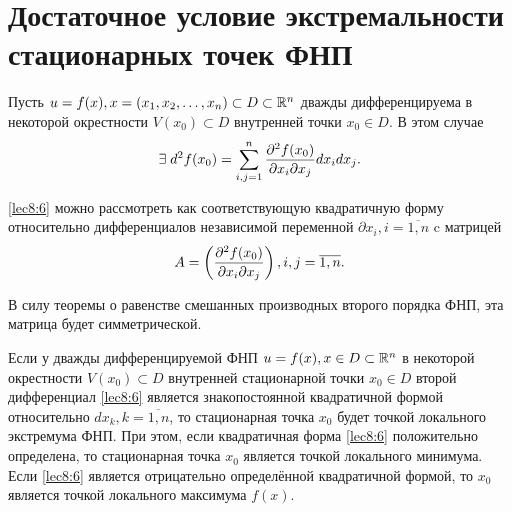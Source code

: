 \documentclass[../../main.tex]{subfiles}
\begin{document}
    \section{Достаточное условие экстремальности стационарных точек ФНП}
    Пусть $u = f(x), x = (x_1, x_2, \ldots, x_n) \subset D \subset \mathbb{R}^n$
    дважды дифференцируема в некоторой окрестности $V(x_0) \subset D$
    внутренней точки $x_0 \in D$. В этом случае
    \begin{equation}
        \exists \; d^2f(x_0) = \sum_{i, j = 1}^n\frac{\partial ^2f(x_0)}{\partial x_i
        \partial x_j}dx_idx_j.
        \label{lec8:6}
    \end{equation}

    \eqref{lec8:6} можно рассмотреть как соответствующую квадратичную
    форму относительно дифференциалов независимой переменной $\partial
    x_i, i = \overline{1, n}$ c матрицей
    \[A = \left(\frac{\partial ^2f(x_0)}{\partial x_i\partial x_j}\right), i,j =
    \overline{1,n}. \]

    В силу теоремы о равенстве смешанных производных второго порядка ФНП,
    эта матрица будет симметрической.

    \begin{thm}
        Если у дважды дифференцируемой ФНП $u=f(x), x \in D \subset \mathbb{R}^n$
        в некоторой окрестности $V(x_0) \subset D$ внутренней стационарной
        точки $x_0 \in D$ второй дифференциал \eqref{lec8:6} является
        знакопостоянной квадратичной формой относительно $dx_k, k =
        \overline{1, n}$, то стационарная точка $x_0$ будет точкой локального
        экстремума ФНП. При этом, если квадратичная форма \eqref{lec8:6}
        положительно определена, то стационарная точка $x_0$ является точкой
        локального минимума. Если \eqref{lec8:6} является отрицательно
        определённой квадратичной формой, то $x_0$ является точкой локального
        максимума $f(x)$.
    \end{thm}
\end{document}

